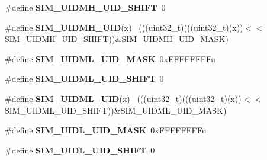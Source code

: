 \begin{DoxyCompactItemize}
\item 
\hypertarget{group___s_i_m___register___masks_ga56b83da182908eb5c406181b72870e54}{}\#define {\bfseries S\+I\+M\+\_\+\+U\+I\+D\+M\+H\+\_\+\+U\+I\+D\+\_\+\+S\+H\+I\+F\+T}~0\label{group___s_i_m___register___masks_ga56b83da182908eb5c406181b72870e54}

\item 
\hypertarget{group___s_i_m___register___masks_gab8c2021ee119a8badd1b3767547274f7}{}\#define {\bfseries S\+I\+M\+\_\+\+U\+I\+D\+M\+H\+\_\+\+U\+I\+D}(x)                                              ~(((uint32\+\_\+t)(((uint32\+\_\+t)(x))$<$$<$S\+I\+M\+\_\+\+U\+I\+D\+M\+H\+\_\+\+U\+I\+D\+\_\+\+S\+H\+I\+F\+T))\&S\+I\+M\+\_\+\+U\+I\+D\+M\+H\+\_\+\+U\+I\+D\+\_\+\+M\+A\+S\+K)\label{group___s_i_m___register___masks_gab8c2021ee119a8badd1b3767547274f7}

\item 
\hypertarget{group___s_i_m___register___masks_ga87fba538d2482490ddfdb1ef8a44ec66}{}\#define {\bfseries S\+I\+M\+\_\+\+U\+I\+D\+M\+L\+\_\+\+U\+I\+D\+\_\+\+M\+A\+S\+K}~0x\+F\+F\+F\+F\+F\+F\+F\+Fu\label{group___s_i_m___register___masks_ga87fba538d2482490ddfdb1ef8a44ec66}

\item 
\hypertarget{group___s_i_m___register___masks_gacedaca5a049852ee395767e70f806c14}{}\#define {\bfseries S\+I\+M\+\_\+\+U\+I\+D\+M\+L\+\_\+\+U\+I\+D\+\_\+\+S\+H\+I\+F\+T}~0\label{group___s_i_m___register___masks_gacedaca5a049852ee395767e70f806c14}

\item 
\hypertarget{group___s_i_m___register___masks_ga875e571a37940db5491a13808878ccf0}{}\#define {\bfseries S\+I\+M\+\_\+\+U\+I\+D\+M\+L\+\_\+\+U\+I\+D}(x)                                              ~(((uint32\+\_\+t)(((uint32\+\_\+t)(x))$<$$<$S\+I\+M\+\_\+\+U\+I\+D\+M\+L\+\_\+\+U\+I\+D\+\_\+\+S\+H\+I\+F\+T))\&S\+I\+M\+\_\+\+U\+I\+D\+M\+L\+\_\+\+U\+I\+D\+\_\+\+M\+A\+S\+K)\label{group___s_i_m___register___masks_ga875e571a37940db5491a13808878ccf0}

\item 
\hypertarget{group___s_i_m___register___masks_ga412340eabbcd0f0d48ce4886e9beb071}{}\#define {\bfseries S\+I\+M\+\_\+\+U\+I\+D\+L\+\_\+\+U\+I\+D\+\_\+\+M\+A\+S\+K}~0x\+F\+F\+F\+F\+F\+F\+F\+Fu\label{group___s_i_m___register___masks_ga412340eabbcd0f0d48ce4886e9beb071}

\item 
\hypertarget{group___s_i_m___register___masks_ga6fb1383717ebfa6f47b5a5952fd21d63}{}\#define {\bfseries S\+I\+M\+\_\+\+U\+I\+D\+L\+\_\+\+U\+I\+D\+\_\+\+S\+H\+I\+F\+T}~0\label{group___s_i_m___register___masks_ga6fb1383717ebfa6f47b5a5952fd21d63}


\end{DoxyCompactItemize}
